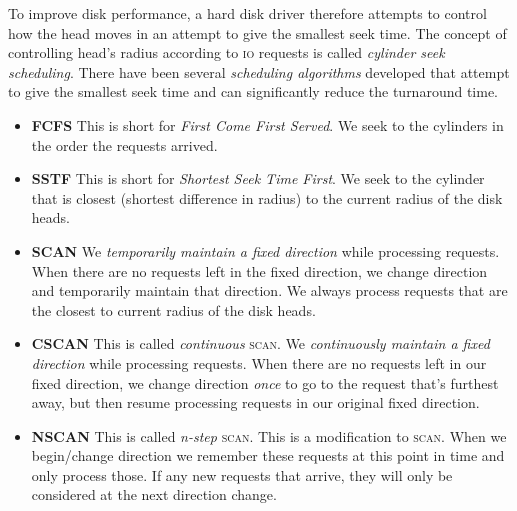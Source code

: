 To improve disk performance, a hard disk driver therefore attempts
to control how the head moves in an attempt to give the smallest seek time. 
The concept of controlling head's radius according to \textsc{io} requests is called 
\textit{cylinder seek scheduling}. There have been several \textit{scheduling algorithms} 
developed that attempt to give the smallest seek time and can significantly reduce 
the turnaround time.  



\begin{figure}[h]
\end{figure}

\begin{itemize}   
\renewcommand{\labelitemi}{$\Box$}
\item \textbf{FCFS} 
This is short for \textit{First Come First Served}. 
We seek to the cylinders in the order the requests arrived. 
\item \textbf{SSTF}
This is short for \textit{Shortest Seek Time First}. 
We seek to the cylinder that is closest (shortest difference in radius) 
to the current radius of the disk heads. 
\item \textbf{SCAN}
We \textit{temporarily maintain a fixed direction} while processing requests. 
When there are no requests left in the fixed direction, we change direction and 
temporarily maintain that direction. 
We always process requests that are the closest to current radius of the disk heads. 
\item \textbf{CSCAN}
This is called \textit{continuous} \textsc{scan}. 
We \textit{continuously maintain a fixed direction} while processing requests.
When there are no requests left in our fixed direction,
we change direction \textit{once} to go to the request that's furthest away, 
but then resume processing requests in our original fixed direction. 
\item \textbf{NSCAN}
This is called \textit{n-step} \textsc{scan}. This is a modification to \textsc{scan}.
When we begin/change direction we remember these requests at this point in time and only
process those. If any new requests that arrive, they will only be 
considered at the next direction change. 
\end{itemize}

